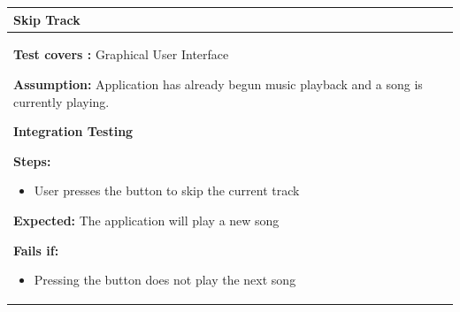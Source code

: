 \documentclass[letterpaper,english, 12pt]{scrreprt}
\begin{document}
\begin{center}
        \begin{tabular}{|C{15cm}|}
                \hline
                        \textbf{Skip Track}\\
                \hline
                        \begin{flushleft}
                                \textbf{Test covers : } Graphical User Interface
                        \end{flushleft}
                        \begin{flushleft}
                                \textbf{Assumption: } Application has already begun music playback and a song is currently playing.
                        \end{flushleft}
			\begin{center}
				\textbf{Integration Testing}
			\end{center}
                        \begin{flushleft}
                                \textbf{Steps:}
                        \end{flushleft}
				\begin{itemize}
					\item User presses the button to skip the current track
				\end{itemize}
			\begin{flushleft}
				\textbf{Expected: } The application will play a new song
			\end{flushleft}
                        \begin{flushleft}
                                \textbf{Fails if: }
                        \end{flushleft}
                                \begin{itemize}
					\item Pressing the button does not play the next song
                                \end{itemize}
				\\
		\hline
        \end{tabular}
\end{center}
\end{document}

